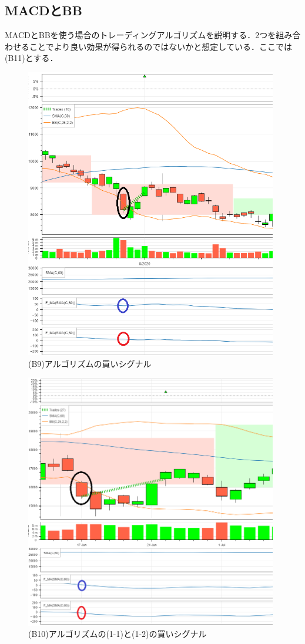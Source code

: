 \subsection{MACDとBB}
MACDとBBを使う場合のトレーディングアルゴリズムを説明する．2つを組み合わせることでより良い効果が得られるのではないかと想定している．ここでは(B11)とする．
\begin{figure}[H]
  \centering
    \includegraphics[width=110mm]{fig/bb_and_nk_and_fma_paint.png}
    \caption{(B9)アルゴリズムの買いシグナル}
    \label{fig:bbnkfma}
   \end{figure}

   


   \begin{figure}[H]
    \centering
    \includegraphics[width=110mm]{fig/bb_and_nk_or_fma0_paint.png}
    \caption{(B10)アルゴリズムの(1-1)と(1-2)の買いシグナル}
    \label{fig:bbnkfma0}
   \end{figure}

